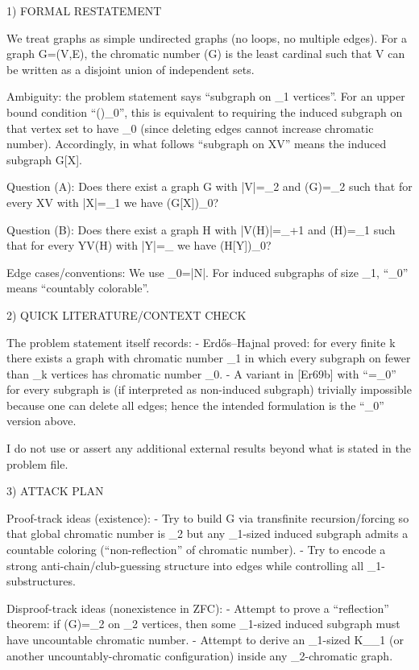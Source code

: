 
1) FORMAL RESTATEMENT

We treat graphs as simple undirected graphs (no loops, no multiple edges).
For a graph G=(V,E), the chromatic number \chi(G) is the least cardinal \kappa such that V can be written as a disjoint union of \kappa independent sets.

Ambiguity: the problem statement says “subgraph on \aleph_1 vertices”.
For an upper bound condition “\chi(\cdot)\le\aleph_0”, this is equivalent to requiring the induced subgraph on that vertex set to have \chi\le\aleph_0 (since deleting edges cannot increase chromatic number).
Accordingly, in what follows “subgraph on X\subseteq V” means the induced subgraph G[X].

Question (A): Does there exist a graph G with |V|=\aleph_2 and \chi(G)=\aleph_2 such that for every X\subseteq V with |X|=\aleph_1 we have \chi(G[X])\le \aleph_0?

Question (B): Does there exist a graph H with |V(H)|=\aleph_{\omega+1} and \chi(H)=\aleph_1 such that for every Y\subseteq V(H) with |Y|=\aleph_{\omega} we have \chi(H[Y])\le \aleph_0?

Edge cases/conventions: We use \aleph_0=|\mathbb N|. For induced subgraphs of size \aleph_1, “\chi\le \aleph_0” means “countably colorable”.


2) QUICK LITERATURE/CONTEXT CHECK

The problem statement itself records:
- Erd\H{o}s–Hajnal proved: for every finite k there exists a graph with chromatic number \aleph_1 in which every subgraph on fewer than \aleph_k vertices has chromatic number \le \aleph_0.
- A variant in [Er69b] with “=\aleph_0” for every subgraph is (if interpreted as non-induced subgraph) trivially impossible because one can delete all edges; hence the intended formulation is the “\le\aleph_0” version above.

I do not use or assert any additional external results beyond what is stated in the problem file.


3) ATTACK PLAN

Proof-track ideas (existence):
- Try to build G via transfinite recursion/forcing so that global chromatic number is \aleph_2 but any \aleph_1-sized induced subgraph admits a countable coloring (“non-reflection” of chromatic number).
- Try to encode a strong anti-chain/club-guessing structure into edges while controlling all \aleph_1-substructures.

Disproof-track ideas (nonexistence in ZFC):
- Attempt to prove a “reflection” theorem: if \chi(G)=\aleph_2 on \aleph_2 vertices, then some \aleph_1-sized induced subgraph must have uncountable chromatic number.
- Attempt to derive an \aleph_1-sized K_{\aleph_1} (or another uncountably-chromatic configuration) inside any \aleph_2-chromatic graph.


